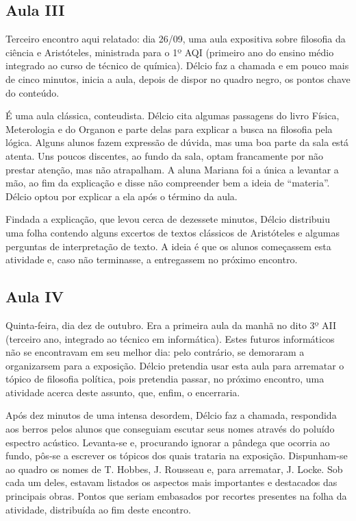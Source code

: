 \documentclass[12pt,a4paper]{article}
\begin{document}
    \subsection*{Aula III}
    
    Terceiro encontro aqui relatado: dia 26/09, uma aula expositiva sobre 
    filosofia da ciência e Aristóteles, ministrada para o 1º AQI (primeiro ano
    do ensino médio integrado ao curso de técnico de química). Délcio faz a 
    chamada e em pouco mais de cinco minutos, inicia a aula, depois de dispor 
    no quadro negro, os pontos chave do conteúdo. 
    
    É uma aula clássica, conteudista. Délcio cita algumas passagens do livro 
    Física, Meterologia e do Organon e parte delas para explicar a busca na 
    filosofia pela lógica. Alguns alunos fazem expressão de dúvida, mas uma boa 
    parte da sala está atenta. Uns poucos discentes, ao fundo da sala, 
    optam francamente por não prestar atenção, mas não atrapalham. A aluna 
    Mariana foi a única a levantar a mão, ao fim da explicação e disse não 
    compreender bem a ideia de ``materia''. Délcio optou por explicar a ela 
    após o término da aula. 
    
    Findada a explicação, que levou cerca de dezessete minutos, Délcio 
    distribuiu uma folha contendo alguns excertos de textos clássicos de 
    Aristóteles e algumas perguntas de interpretação de texto. A ideia é que 
    os alunos começassem esta atividade e, caso não terminasse, a entregassem 
    no próximo encontro. 
    
    \subsection*{Aula IV}

	Quinta-feira, dia dez de outubro. Era a primeira aula da manhã no dito 3º 
	AII (terceiro ano, integrado ao técnico em informática). Estes futuros 
	informáticos não se encontravam em seu melhor dia: pelo contrário, se 
	demoraram a organizarsem para a exposição. Délcio pretendia usar esta aula 
	para arrematar o tópico de filosofia política, pois pretendia passar, no 
	próximo encontro, uma atividade acerca deste assunto, que, enfim, o 
	encerraria. 
	
	Após dez minutos de uma intensa desordem, Délcio faz a chamada, respondida 
	aos berros pelos alunos que conseguiam escutar seus nomes através do 
	poluído espectro acústico. Levanta-se e, procurando ignorar a pândega que 
	ocorria ao fundo, pôs-se a escrever os tópicos dos quais trataria na 
	exposição. Dispunham-se ao quadro os nomes de T. Hobbes, J. Rousseau e, 
	para arrematar, J. Locke. Sob cada um deles, estavam listados os aspectos 
	mais importantes e destacados das principais obras. Pontos que seriam 
	embasados por recortes presentes na folha da atividade, distribuída ao 
	fim deste encontro. 
	
\end{document}
